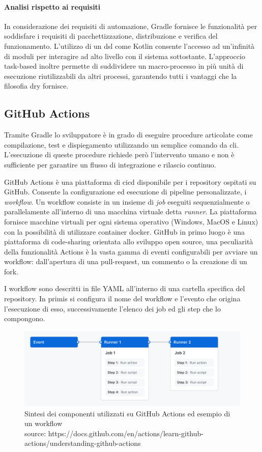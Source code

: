 \paragraph{Analisi rispetto ai requisiti}
In considerazione dei requisiti di automazione, Gradle fornisce le funzionalità per soddisfare i requisiti di pacchettizzazione, distribuzione e verifica del funzionamento. L'utilizzo di un \ac{dsl} come Kotlin consente l'accesso ad un'infinità di moduli per interagire ad alto livello con il sistema sottostante. L'approccio task-based inoltre permette di suddividere un macro-processo in più unità di esecuzione riutilizzabili da altri processi, garantendo tutti i vantaggi che la filosofia \ac{dry} fornisce.

\newpage
\subsection{GitHub Actions}

Tramite Gradle lo sviluppatore è in grado di eseguire procedure articolate come compilazione, test e dispiegamento utilizzando un semplice comando da \ac{cli}. L'esecuzione di queste procedure richiede però l'intervento umano e non è sufficiente per garantire un flusso di integrazione e rilascio continuo. 

GitHub Actions è una piattaforma di \ac{cicd} disponibile per i repository ospitati su GitHub. Consente la configurazione ed esecuzione di pipeline personalizzate, i \textit{workflow}. Un workflow consiste in un insieme di \textit{job} eseguiti sequenzialmente o parallelamente all'interno di una macchina virtuale detta \textit{runner}. La piattaforma fornisce macchine virtuali per ogni sistema operativo (Windows, MacOS e Linux) con la possibilità di utilizzare container docker. GitHub in primo luogo è una piattaforma di code-sharing orientata allo sviluppo open source, una peculiarità della funzionalità Actions è la vasta gamma di eventi configurabili per avviare un workflow: dall'apertura di una pull-request, un commento o la creazione di un fork.

I workflow sono descritti in file YAML all'interno di una cartella specifica del repository. In primis si configura il nome del workflow e l'evento che origina l'esecuzione di esso, successivamente l'elenco dei job ed gli step che lo compongono. 

\begin{figure}[H]
	\centering
	\includegraphics[width=.9\linewidth]{figures/overview-actions-simple.png}
	\caption{Sintesi dei componenti utilizzati su GitHub Actions ed esempio di un workflow \\ source: https://docs.github.com/en/actions/learn-github-actions/understanding-github-actions}
	\label{fig:github-actions-example}
\end{figure}

